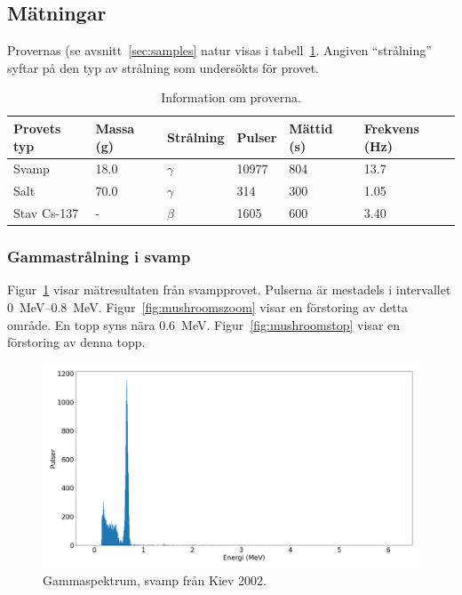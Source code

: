 \subsection{Mätningar} \label{sec:measurements}

Provernas (se avsnitt~\ref{sec:samples} natur visas i tabell~\ref{tab:samples}.
Angiven ``strålning'' syftar på den typ av strålning som undersökts för provet.

\begin{table}[!ht]
    \begin{tabular}{|l|l|l|l|l|l|}
    \hline
    Provets typ & Massa (\unit{g}) & Strålning & Pulser      & Mättid (\unit{s}) & Frekvens (\unit{\Hz}) \\
    \hline
    Svamp       & \num{18.0}       & $\gamma$  & \num{10977} & \num{804}         & \num{13.7}            \\
    \hline
    Salt        & \num{70.0}       & $\gamma$  & \num{314}   & \num{300}         & \num{1.05}            \\
    \hline
    Stav Cs-137 & -                & $\beta$   & \num{1605}  & \num{600}         & \num{3.40}            \\
    \hline
    \end{tabular}
    \caption{Information om proverna.}
    \label{tab:samples}
\end{table}

\subsubsection{Gammastrålning i svamp}

Figur~\ref{fig:mushrooms} visar mätresultaten från svampprovet. Pulserna är
mestadels i intervallet \qtyrange{0}{0.8}{\MeV}. Figur~\ref{fig:mushroomszoom}
visar en förstoring av detta område. En topp syns nära \qty{0.6}{\MeV}.
Figur~\ref{fig:mushroomstop} visar en förstoring av denna topp.

\begin{figure}[!ht]
    \centering
    \includegraphics[width=\textwidth, keepaspectratio]{../images/mushrooms.png}
    \caption{Gammaspektrum, svamp från Kiev 2002.}
    \label{fig:mushrooms}
\end{figure}

